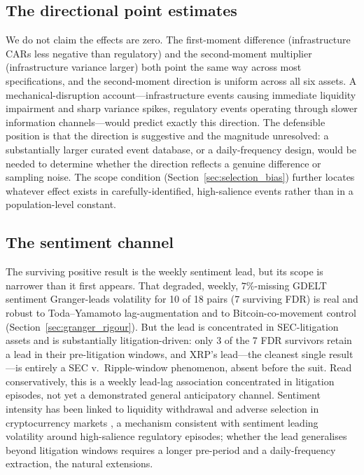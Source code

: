 \documentclass[pdflatex,sn-mathphys-num]{sn-jnl}
\theoremstyle{thmstyleone}
\theoremstyle{thmstyletwo}
\theoremstyle{thmstylethree}
\begin{document}
\subsection{The directional point estimates}

We do not claim the effects are zero. The first-moment difference (infrastructure CARs less negative than regulatory) and the second-moment multiplier (infrastructure variance larger) both point the same way across most specifications, and the second-moment direction is uniform across all six assets. A mechanical-disruption account---infrastructure events causing immediate liquidity impairment and sharp variance spikes, regulatory events operating through slower information channels---would predict exactly this direction. The defensible position is that the direction is suggestive and the magnitude unresolved: a substantially larger curated event database, or a daily-frequency design, would be needed to determine whether the direction reflects a genuine difference or sampling noise. The scope condition (Section~\ref{sec:selection_bias}) further locates whatever effect exists in carefully-identified, high-salience events rather than in a population-level constant.

\subsection{The sentiment channel}

The surviving positive result is the weekly sentiment lead, but its scope is narrower than it first appears. That degraded, weekly, $7\%$-missing GDELT sentiment Granger-leads volatility for 10 of 18 pairs (7 surviving FDR) is real and robust to Toda--Yamamoto lag-augmentation and to Bitcoin-co-movement control (Section~\ref{sec:granger_rigour}). But the lead is concentrated in SEC-litigation assets and is substantially litigation-driven: only 3 of the 7 FDR survivors retain a lead in their pre-litigation windows, and XRP's lead---the cleanest single result---is entirely a SEC v.\ Ripple-window phenomenon, absent before the suit. Read conservatively, this is a weekly lead-lag association concentrated in litigation episodes, not yet a demonstrated general anticipatory channel. Sentiment intensity has been linked to liquidity withdrawal and adverse selection in cryptocurrency markets \citep{Farzulla2025Extremity}, a mechanism consistent with sentiment leading volatility around high-salience regulatory episodes; whether the lead generalises beyond litigation windows requires a longer pre-period and a daily-frequency extraction, the natural extensions.
\end{document}
